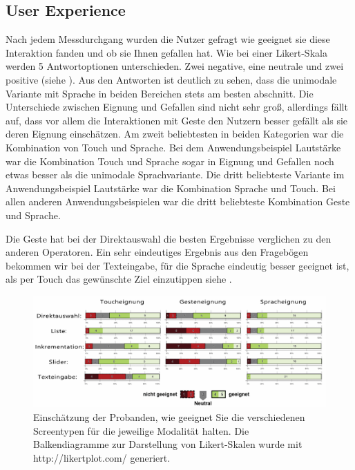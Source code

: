 \subsection[User Experience]{User Experience}
Nach jedem Messdurchgang wurden die Nutzer gefragt wie geeignet sie diese Interaktion fanden und ob sie Ihnen gefallen hat. 
Wie bei einer Likert-Skala werden 5 Antwortoptionen unterschieden. Zwei negative, eine neutrale und zwei positive (siehe ). 
Aus den Antworten ist deutlich zu sehen, dass die unimodale Variante mit Sprache in beiden Bereichen stets am besten abschnitt. 
Die Unterschiede zwischen Eignung und Gefallen sind nicht sehr groß, allerdings fällt auf, dass vor allem die Interaktionen mit Geste den Nutzern besser gefällt als sie deren Eignung einschätzen. 
Am zweit beliebtesten in beiden Kategorien war die Kombination von Touch und Sprache. 
Bei dem Anwendungsbeispiel Lautstärke war die Kombination Touch und Sprache sogar in Eignung und Gefallen noch etwas besser als die unimodale Sprachvariante. 
Die dritt beliebteste Variante im Anwendungsbeispiel Lautstärke war die Kombination Sprache und Touch. 
Bei allen anderen Anwendungsbeispielen war die dritt beliebteste Kombination Geste und Sprache. 

Die Geste hat bei der Direktauswahl die besten Ergebnisse verglichen zu den anderen Operatoren. 
Ein sehr eindeutiges Ergebnis aus den Fragebögen bekommen wir bei der Texteingabe, für die Sprache eindeutig besser geeignet ist, als per Touch das gewünschte Ziel einzutippen siehe .
\begin{figure}[ht]
  \centering
  \includegraphics[width=1\textwidth]{img/Uebersicht_Eignung}
  \caption[Eignung des Screentypen]{Einschätzung der Probanden, wie geeignet Sie die verschiedenen Screentypen für die jeweilige Modalität halten. 
	Die Balkendiagramme zur Darstellung von Likert-Skalen wurde mit http://likertplot.com/ generiert.}
  \label{fig:Uebersicht_Eignung}
\end{figure}

